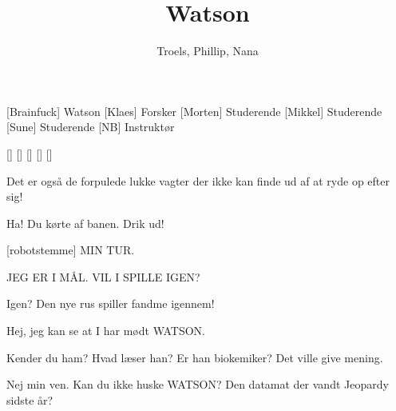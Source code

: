 \documentclass[a4paper,11pt]{article}
\title{Watson}
\author{Troels, Phillip, Nana}
\begin{document}
\maketitle

\begin{roles}
[Brainfuck] Watson
[Klaes] Forsker
[Morten] Studerende
[Mikkel] Studerende
[Sune] Studerende
[NB] Instruktør
\end{roles}

\begin{props}
[]
[]
[]
[]
[]
\end{props}

\begin{sketch}



 Det er også de forpulede lukke vagter der ikke kan finde ud af at ryde op efter sig!


 Ha! Du kørte af banen. Drik ud!


 [robotstemme] MIN TUR.



 JEG ER I MÅL. VIL I SPILLE IGEN?


 Igen? Den nye rus spiller fandme igennem!


 Hej, jeg kan se at I har mødt WATSON.

 Kender du ham? Hvad læser han? Er han biokemiker? Det ville give mening.


 Nej min ven. Kan du ikke huske WATSON? Den datamat der vandt
Jeopardy sidste år?


\end{sketch}
\end{document}
